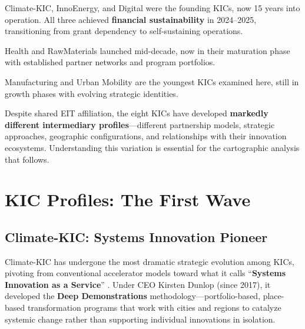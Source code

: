 \documentclass[../main.tex]{subfiles}
\begin{document}
\begin{description}[leftmargin=0.5cm, itemsep=0.3em]
\item[First Wave (2010)] Climate-KIC, InnoEnergy, and Digital were the founding KICs, now 15 years into operation. All three achieved \textbf{financial sustainability} in 2024--2025, transitioning from grant dependency to self-sustaining operations.
\item[Second Wave (2015)] Health and RawMaterials launched mid-decade, now in their maturation phase with established partner networks and program portfolios.
\item[Third Wave (2019)] Manufacturing and Urban Mobility are the youngest KICs examined here, still in growth phases with evolving strategic identities.
\end{description}

Despite shared EIT affiliation, the eight KICs have developed \textbf{markedly different intermediary profiles}---different partnership models, strategic approaches, geographic configurations, and relationships with their innovation ecosystems. Understanding this variation is essential for the cartographic analysis that follows.


\section*{KIC Profiles: The First Wave}

\subsection*{Climate-KIC: Systems Innovation Pioneer}


Climate-KIC has undergone the most dramatic strategic evolution among KICs, pivoting from conventional accelerator models toward what it calls ``\textbf{Systems Innovation as a Service}'' . Under CEO Kirsten Dunlop (since 2017), it developed the \textbf{Deep Demonstrations} methodology---portfolio-based, place-based transformation programs that work with cities and regions to catalyze systemic change rather than supporting individual innovations in isolation.
\end{document}

